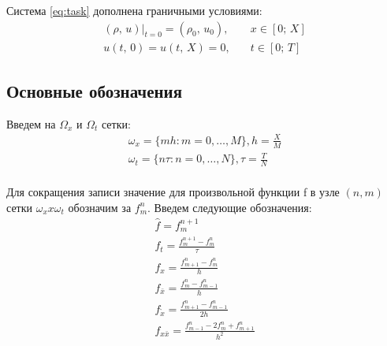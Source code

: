 Система \eqref{eq:task} дополнена граничными условиями:
\begin{equation} \label{eq:terms}
	\begin{array}{lc}
		(\rho, \, u)|_{t = 0} = (\rho_0, \, u_0), &\quad x \in [0; \, X] \\
		u (t, \, 0) = u (t, \, X) = 0, &\quad t \in [0; \, T]
	\end{array}
\end{equation}

\subsection{Основные обозначения}
Введем на $\Omega_x$ и $\Omega_t$ сетки:
\begin{equation}
	\begin{array}{lc}
		\omega_x = \{mh: m = 0, \dots, M\}, h = \frac{X}{M}\\
		\omega_t = \{n\tau: n = 0, \dots, N\}, \tau = \frac{T}{N}\\
	\end{array}
\end{equation}

Для сокращения записи значение для произвольной функции f в узле $(n,m)$ сетки $\omega_x x \omega_t$ обозначим за $f_m^n$. Введем следующие обозначения:
\begin{equation}
	\begin{array}{lc}
		\hat{f} = f_m^{n+1}\\
		f_t = \frac{f_m^{n+1} - f_m^n}{\tau}\\
		f_x = \frac{f_{m+1}^n - f^n_m}{h}\\
		f_{\bar{x}} = \frac{f_m^n - f^n_{m-1}}{h}\\
		f_{\mathring{x}} = \frac{f_{m+1}^n - f^n_{m-1}}{2h}\\
		f_{x\bar{x}} = \frac{f^n_{m-1} - 2f_m^n + f^n_{m+1}}{h^2}\\
	\end{array}
\end{equation}
	